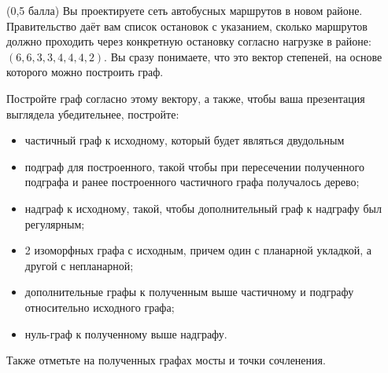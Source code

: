 \question
(0,5 балла) Вы проектируете сеть автобусных маршрутов в новом районе. Правительство даёт вам список остановок с указанием, сколько маршрутов должно проходить через конкретную остановку согласно нагрузке в районе: $(6, 6, 3, 3, 4, 4, 4, 2)$. Вы сразу понимаете, что это вектор степеней, на основе которого можно построить граф.

Постройте граф согласно этому вектору, а также, чтобы ваша презентация выглядела убедительнее, постройте:

\begin{itemize}
\item частичный граф к исходному, который будет являться двудольным
\item подграф для построенного, такой чтобы при пересечении полученного подграфа и ранее построенного частичного графа получалось дерево;
\item надграф к исходному, такой, чтобы дополнительный граф к надграфу был регулярным;
\item 2 изоморфных графа с исходным, причем один с планарной укладкой, а другой с непланарной;
\item дополнительные графы к полученным выше частичному и подграфу относительно исходного графа;
\item нуль-граф к полученному выше надграфу.
\end{itemize}

Также отметьте на полученных графах мосты и точки сочленения.
